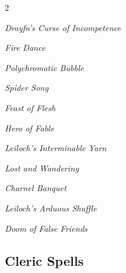\documentclass[10pt,a4paper,twoside,bg=print,twocolumn,openany,nodeprecatedcode]{dndbook}
\begin{document}
\begin{description}
\begin{multicols}{2}
{\par \vspace { 9pt plus 3pt minus 3pt } \noindent  {} \nopagebreak }

\begin{description}
\item \textit{Drayfn's Curse of Incompetence}
\item \textit{Fire Dance}
\item \textit{Polychromatic Bubble}
\item \textit{Spider Song}
\end{description}

{\par \vspace { 9pt plus 3pt minus 3pt } \noindent  {} \nopagebreak }

\begin{description}
\item \textit{Feast of Flesh}
\item \textit{Hero of Fable}
\item \textit{Leiloch's Interminable Yarn}
\item \textit{Lost and Wandering}
\end{description}

{\par \vspace { 9pt plus 3pt minus 3pt } \noindent  {} \nopagebreak }

\begin{description}
\item \textit{Charnel Banquet}
\item \textit{Leiloch's Arduous Shuffle}
\end{description}

{\par \vspace { 9pt plus 3pt minus 3pt } \noindent  {} \nopagebreak }

\begin{description}
\item \textit{Doom of False Friends}
\end{description}

\end{multicols}

\end{description}

\subsection{Cleric Spells}
\end{document}

